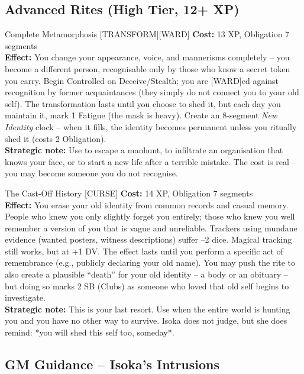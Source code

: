 \documentclass[10pt,a5paper]{book}
\begin{document}
\subsection*{Advanced Rites (High Tier, 12+ XP)}

\begin{patronbox}{Complete Metamorphosis [TRANSFORM][WARD]}
\textbf{Cost:} 13 XP, Obligation 7 segments \\
\textbf{Effect:} You change your appearance, voice, and mannerisms completely – you become a different person, recognisable only by those who know a secret token you carry. Begin Controlled on Deceive/Stealth; you are [WARD]ed against recognition by former acquaintances (they simply do not connect you to your old self). The transformation lasts until you choose to shed it, but each day you maintain it, mark 1 Fatigue (the mask is heavy). Create an 8‑segment \textit{New Identity} clock – when it fills, the identity becomes permanent unless you ritually shed it (costs 2 Obligation). \\
\textbf{Strategic note:} Use to escape a manhunt, to infiltrate an organisation that knows your face, or to start a new life after a terrible mistake. The cost is real – you may become someone you do not recognise.
\end{patronbox}

\begin{patronbox}{The Cast‑Off History [CURSE]}
\textbf{Cost:} 14 XP, Obligation 7 segments \\
\textbf{Effect:} You erase your old identity from common records and casual memory. People who knew you only slightly forget you entirely; those who knew you well remember a version of you that is vague and unreliable. Trackers using mundane evidence (wanted posters, witness descriptions) suffer –2 dice. Magical tracking still works, but at +1 DV. The effect lasts until you perform a specific act of remembrance (e.g., publicly declaring your old name). You may push the rite to also create a plausible “death” for your old identity – a body or an obituary – but doing so marks 2 SB (Clubs) as someone who loved that old self begins to investigate. \\
\textbf{Strategic note:} This is your last resort. Use when the entire world is hunting you and you have no other way to survive. Isoka does not judge, but she does remind: *you will shed this self too, someday*.
\end{patronbox}

\subsection*{GM Guidance – Isoka’s Intrusions}
\end{document}
